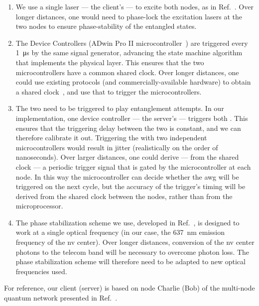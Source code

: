 \begin{enumerate}
    \item We use a single laser --- the client's --- to excite both nodes, as in
          Ref.~\cite{pompili_2021_multinode}. Over longer distances, one would need to phase-lock
          the excitation lasers at the two nodes to ensure phase-stability of the entangled states.
    \item The Device Controllers (ADwin Pro II microcontroller~\cite{adwin}) are triggered every
          \qty{1}{\us} by the same signal generator, advancing the state machine algorithm that
          implements the physical layer. This ensures that the two microcontrollers have a common
          shared clock. Over longer distances, one could use existing protocols (and
          commercially-available hardware) to obtain a shared clock~\cite{whiterabbit}, and use that
          to trigger the microcontrollers.
    \item The two  need to be triggered to play entanglement attempts. In our
          implementation, one device controller --- the server's --- triggers both .
          This ensures that the triggering delay between the two  is constant, and
          we can therefore calibrate it out. Triggering the  with two independent
          microcontrollers would result in jitter (realistically on the order of nanoseconds). Over
          larger distances, one could derive --- from the shared clock --- a periodic trigger signal
          that is gated by the microcontroller at each node. In this way the microcontroller can
          decide whether the \acrshort{awg} will be triggered on the next cycle, but the accuracy of
          the trigger's timing will be derived from the shared clock between the nodes, rather than
          from the microprocessor.
    \item The phase stabilization scheme we use, developed in Ref.~\cite{pompili_2021_multinode}, is
          designed to work at a single optical frequency (in our case, the \qty{637}{\nm} emission
          frequency of the \acrshort{nv} center). Over longer distances, conversion of the
          \acrshort{nv} center photons to the telecom band will be necessary to overcome photon
          loss. The phase stabilization scheme will therefore need to be adapted to new optical
          frequencies used.
\end{enumerate}

For reference, our client (server) is based on node Charlie (Bob) of the multi-node quantum network
presented in Ref.~\cite{pompili_2021_multinode}.

